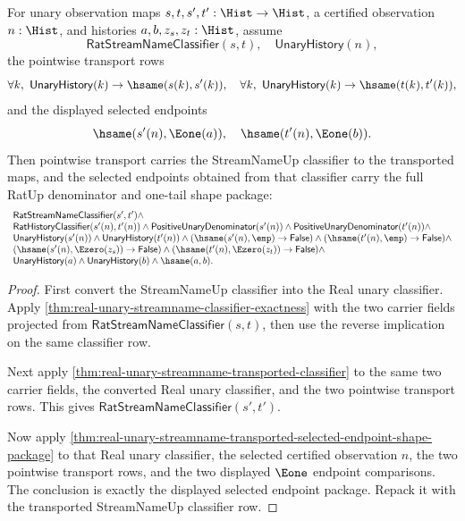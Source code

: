 \begin{theorem}
\label{thm:real-unary-streamname-classifier-selected-endpoint-shape-package}
For unary observation maps $s,t,s',t':\Hist\to\Hist$, a certified observation
$n:\Hist$, and histories $a,b,z_s,z_t:\Hist$, assume
$$
\mathsf{RatStreamNameClassifier}(s,t),\quad
\mathsf{UnaryHistory}(n),
$$
the pointwise transport rows
$$
\forall k,\ \mathsf{UnaryHistory}(k)\to\hsame(s(k),s'(k)),
\quad
\forall k,\ \mathsf{UnaryHistory}(k)\to\hsame(t(k),t'(k)),
$$
and the displayed selected endpoints
$$
\hsame(s'(n),\Eone(a)),\quad \hsame(t'(n),\Eone(b)).
$$
Then pointwise transport carries the StreamNameUp classifier to the transported
maps, and the selected endpoints obtained from that classifier carry the full
RatUp denominator and one-tail shape package:
$$
\begin{array}{l}
\mathsf{RatStreamNameClassifier}(s',t')\land\\
\mathsf{RatHistoryClassifier}(s'(n),t'(n))\land
\mathsf{PositiveUnaryDenominator}(s'(n))\land
\mathsf{PositiveUnaryDenominator}(t'(n))\land\\
\mathsf{UnaryHistory}(s'(n))\land
\mathsf{UnaryHistory}(t'(n))\land
(\hsame(s'(n),\emp)\to\mathsf{False})\land
(\hsame(t'(n),\emp)\to\mathsf{False})\land\\
(\hsame(s'(n),\Ezero(z_s))\to\mathsf{False})\land
(\hsame(t'(n),\Ezero(z_t))\to\mathsf{False})\land\\
\mathsf{UnaryHistory}(a)\land
\mathsf{UnaryHistory}(b)\land
\hsame(a,b).
\end{array}
$$
\end{theorem}
\begin{proof}
First convert the StreamNameUp classifier into the Real unary classifier. Apply
\autoref{thm:real-unary-streamname-classifier-exactness} with the two carrier
fields projected from $\mathsf{RatStreamNameClassifier}(s,t)$, then use the
reverse implication on the same classifier row.

Next apply \autoref{thm:real-unary-streamname-transported-classifier} to the
same two carrier fields, the converted Real unary classifier, and the two
pointwise transport rows. This gives
$\mathsf{RatStreamNameClassifier}(s',t')$.

Now apply
\autoref{thm:real-unary-streamname-transported-selected-endpoint-shape-package}
to that Real unary classifier, the selected certified observation $n$, the two
pointwise transport rows, and the two displayed $\Eone$ endpoint comparisons.
The conclusion is exactly the displayed selected endpoint package. Repack it
with the transported StreamNameUp classifier row.
\end{proof}

